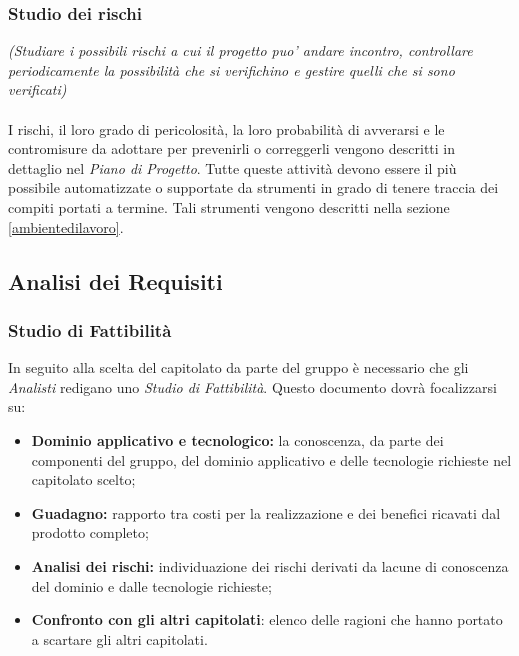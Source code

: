 \subsubsection{Studio dei rischi}
\textit{(Studiare i possibili rischi a cui il progetto puo' andare incontro, controllare periodicamente la possibilità che si verifichino e gestire quelli che si sono verificati)}\\ \\
I rischi, il loro grado di pericolosità, la loro probabilità di avverarsi e le contromisure da adottare per prevenirli o correggerli vengono descritti in dettaglio nel \textit{Piano di Progetto}.
Tutte queste attività devono essere il più possibile automatizzate o supportate da strumenti in grado di tenere traccia dei compiti portati a termine. Tali strumenti vengono descritti nella sezione \ref{ambientedilavoro}.


\subsection{Analisi dei Requisiti}
\subsubsection{Studio di Fattibilità}
In seguito alla scelta del capitolato da parte del gruppo è necessario che gli \textit{Analisti} redigano uno \textit{Studio di Fattibilità}. Questo documento dovrà focalizzarsi su:
\begin{itemize}
\item \textbf{Dominio applicativo e tecnologico:} la conoscenza, da parte dei componenti del gruppo, del dominio applicativo e delle tecnologie richieste nel capitolato scelto; 
\item \textbf{Guadagno:} rapporto tra costi per la realizzazione e dei benefici ricavati dal prodotto completo;
\item \textbf{Analisi dei rischi:} individuazione dei rischi derivati da lacune di conoscenza del dominio e dalle tecnologie richieste;
\item \textbf{Confronto con gli altri capitolati}: elenco delle ragioni che hanno portato a scartare gli altri capitolati.
\end{itemize}
